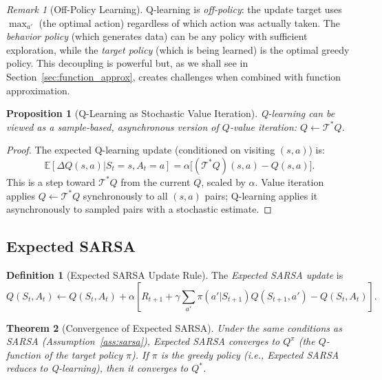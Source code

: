 \documentclass[11pt,a4paper]{article}
\theoremstyle{definition}
\newtheorem{definition}{Definition}[section]
\theoremstyle{plain}
\newtheorem{theorem}{Theorem}[section]
\newtheorem{proposition}[theorem]{Proposition}
\theoremstyle{remark}
\newtheorem{remark}{Remark}[section]
\newcommand{\E}{\mathbb{E}}
\begin{document}
\begin{remark}[Off-Policy Learning]
\label{rem:qlearning_off_policy}
Q-learning is \emph{off-policy}: the update target uses $\max_{a'}$ (the optimal action) regardless of which action was actually taken. The \emph{behavior policy} (which generates data) can be any policy with sufficient exploration, while the \emph{target policy} (which is being learned) is the optimal greedy policy. This decoupling is powerful but, as we shall see in Section~\ref{sec:function_approx}, creates challenges when combined with function approximation.
\end{remark}

\begin{proposition}[Q-Learning as Stochastic Value Iteration]
\label{prop:ql_value_iteration}
Q-learning can be viewed as a sample-based, asynchronous version of $Q$-value iteration: $Q \leftarrow \mathcal{T}^* Q$.
\end{proposition}

\begin{proof}
The expected Q-learning update (conditioned on visiting $(s,a)$) is:
\begin{equation}
    \E[\Delta Q(s,a) | S_t=s, A_t=a] = \alpha\bigl[(\mathcal{T}^* Q)(s,a) - Q(s,a)\bigr].
\end{equation}
This is a step toward $\mathcal{T}^* Q$ from the current $Q$, scaled by $\alpha$. Value iteration applies $Q \leftarrow \mathcal{T}^* Q$ synchronously to all $(s,a)$ pairs; Q-learning applies it asynchronously to sampled pairs with a stochastic estimate.
\end{proof}

\subsection{Expected SARSA}
\label{subsec:expected_sarsa}

\begin{definition}[Expected SARSA Update Rule]
\label{def:expected_sarsa}
The \emph{Expected SARSA update} is
\begin{equation}
    Q(S_t, A_t) \leftarrow Q(S_t, A_t) + \alpha\!\left[R_{t+1} + \gamma \sum_{a'} \pi(a'|S_{t+1}) Q(S_{t+1}, a') - Q(S_t, A_t)\right].
    \label{eq:expected_sarsa}
\end{equation}
\end{definition}

\begin{theorem}[Convergence of Expected SARSA]
\label{thm:expected_sarsa_convergence}
Under the same conditions as SARSA (Assumption~\ref{ass:sarsa}), Expected SARSA converges to $Q^\pi$ (the $Q$-function of the target policy $\pi$). If $\pi$ is the greedy policy (i.e., Expected SARSA reduces to Q-learning), then it converges to $Q^*$.
\end{theorem}
\end{document}
